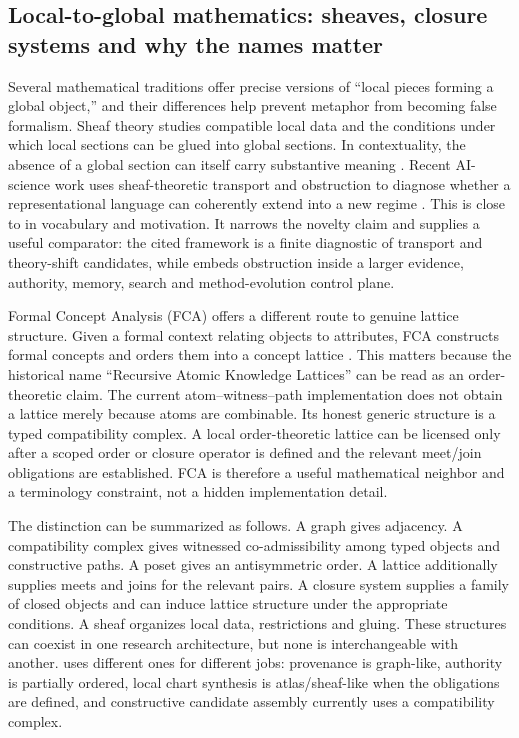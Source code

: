 \subsection{Local-to-global mathematics: sheaves, closure systems and why the names matter}

Several mathematical traditions offer precise versions of ``local pieces forming a global object,'' and their differences help prevent metaphor from becoming false formalism. Sheaf theory studies compatible local data and the conditions under which local sections can be glued into global sections. In contextuality, the absence of a global section can itself carry substantive meaning \cite{abramsky2011}. Recent AI-science work uses sheaf-theoretic transport and obstruction to diagnose whether a representational language can coherently extend into a new regime \cite{olivieri2026sheaf}. This is close to \RAKL{} in vocabulary and motivation. It narrows the novelty claim and supplies a useful comparator: the cited framework is a finite diagnostic of transport and theory-shift candidates, while \RAKL{} embeds obstruction inside a larger evidence, authority, memory, search and method-evolution control plane.

Formal Concept Analysis (FCA) offers a different route to genuine lattice structure. Given a formal context relating objects to attributes, FCA constructs formal concepts and orders them into a concept lattice \cite{ganterwille2024}. This matters because the historical name ``Recursive Atomic Knowledge Lattices'' can be read as an order-theoretic claim. The current atom--witness--path implementation does not obtain a lattice merely because atoms are combinable. Its honest generic structure is a typed compatibility complex. A local order-theoretic lattice can be licensed only after a scoped order or closure operator is defined and the relevant meet/join obligations are established. FCA is therefore a useful mathematical neighbor and a terminology constraint, not a hidden implementation detail.

The distinction can be summarized as follows. A graph gives adjacency. A compatibility complex gives witnessed co-admissibility among typed objects and constructive paths. A poset gives an antisymmetric order. A lattice additionally supplies meets and joins for the relevant pairs. A closure system supplies a family of closed objects and can induce lattice structure under the appropriate conditions. A sheaf organizes local data, restrictions and gluing. These structures can coexist in one research architecture, but none is interchangeable with another. \RAKL{} uses different ones for different jobs: provenance is graph-like, authority is partially ordered, local chart synthesis is atlas/sheaf-like when the obligations are defined, and constructive candidate assembly currently uses a compatibility complex.

